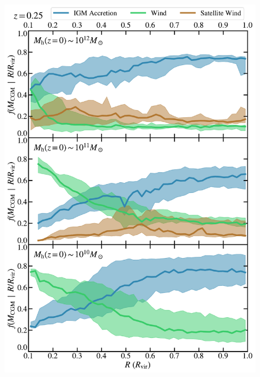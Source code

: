 \documentclass[fleqn,usenatbib]{mnras}
\begin{document}
\begin{figure}
\centering
\begin{minipage}{0.495\textwidth}
\centering
\includegraphics[width=\textwidth]{figures/CGM_fraction_profile_snum465.pdf}
\end{minipage} \hfill
\begin{minipage}{0.495\textwidth}
\centering

\end{minipage}
\end{figure}
\end{document}
